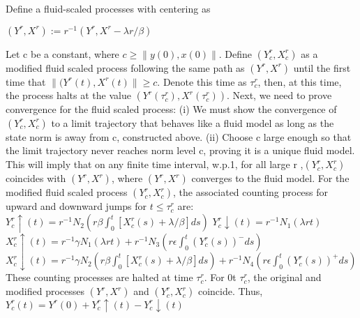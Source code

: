 Define a fluid-scaled processes with centering as
\begin{center}
$(Y^r , X^r):= r^{-1} (Y^r, X^r - \lambda r/\beta)$
\end{center}
\newline
\newline
Let c be a constant, where $ c \geq \| y(0), x(0) \|$. Define $(Y_c^r,X_c^r)$ as a modified fluid scaled process following the same path as $(Y^r,X^r)$ until the first time that $\|(Y^r(t),X^r(t)\| \geq c$. Denote this time as $\tau_c^r$, then, at this time, the process halts at the value $(Y^r(\tau_c^r),X^r(\tau_c^r))$. 
\newline
\newline Next, we need to prove convergence for the fluid scaled process:
\newline (i) We must show the convergence of $(Y_c^r,X_c^r)$ to a limit trajectory that behaves like a fluid model as long as the state norm is away from c, constructed above.
\newline (ii) Choose c large enough so that the limit trajectory never reaches norm level c, proving it is a unique fluid model. This will imply that on any finite time interval, w.p.1, for all large r ,$(Y_c^r, X_c^r)$ coincides with $(Y^ r , X^ r )$, where $(Y^ r , X^ r )$ converges to the fluid model.
\newline\newline
For the modified fluid scaled process $(Y_c^r,X_c^r)$, the associated counting process for upward and downward jumps for $t\leq \tau _c^r$ are:
\newline
\newline $Y_c^r \uparrow(t) = r^{-1} N_2(r\beta \int_0^t[X^r_c(s) +\lambda/\beta]ds)$
 \newline $Y_c^r \downarrow(t) = r^{-1} N_1(\lambda rt)$
\newline  $X_c^r \uparrow(t) = r^{-1}\gamma N_1(\lambda rt) +r^{-1} N_3 (r \epsilon \int_0^t(Y^r_c(s))^- ds)$
\newline $X_c^r \downarrow(t) =r^{-1}\gamma N_2(r \beta \int_0^t[X^r_c(s) +\lambda/\beta]ds) +r^{-1} N_4 (r\epsilon\int_0^t(Y^r_c(s))^+ ds)$
\newline\newline
These counting processes are halted at time $\tau_c^r$. For 0\leq t \leq $\tau_c^r$, the original and modified processes $(Y^r , X^r)$ and $(Y_c^r,X_c^r)$ coincide. Thus,
\newline\newline
$Y^r_c(t)=Y^r(0) + Y_c^r \uparrow(t) - Y_c^r \downarrow(t)$
